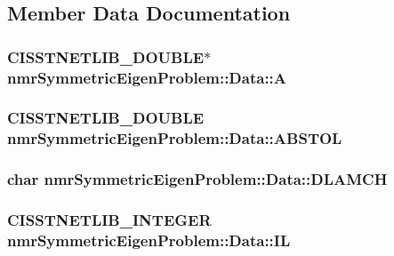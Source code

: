 \subsection{Member Data Documentation}
\hypertarget{classnmr_symmetric_eigen_problem_1_1_data_aa45f414eef4fb85b15868757aa728448}{
\subsubsection[{A}]{\setlength{\rightskip}{0pt plus 5cm}C\-I\-S\-S\-T\-N\-E\-T\-L\-I\-B\-\_\-\-D\-O\-U\-B\-L\-E$\ast$ nmr\-Symmetric\-Eigen\-Problem\-::\-Data\-::\-A}}\label{classnmr_symmetric_eigen_problem_1_1_data_aa45f414eef4fb85b15868757aa728448}
\hypertarget{classnmr_symmetric_eigen_problem_1_1_data_af5347eda97d1b64505380937953d1d97}{
\subsubsection[{A\-B\-S\-T\-O\-L}]{\setlength{\rightskip}{0pt plus 5cm}C\-I\-S\-S\-T\-N\-E\-T\-L\-I\-B\-\_\-\-D\-O\-U\-B\-L\-E nmr\-Symmetric\-Eigen\-Problem\-::\-Data\-::\-A\-B\-S\-T\-O\-L}}\label{classnmr_symmetric_eigen_problem_1_1_data_af5347eda97d1b64505380937953d1d97}
\hypertarget{classnmr_symmetric_eigen_problem_1_1_data_a0d4cc9287cdb029e975938ed4c153d65}{
\subsubsection[{D\-L\-A\-M\-C\-H}]{\setlength{\rightskip}{0pt plus 5cm}char nmr\-Symmetric\-Eigen\-Problem\-::\-Data\-::\-D\-L\-A\-M\-C\-H}}\label{classnmr_symmetric_eigen_problem_1_1_data_a0d4cc9287cdb029e975938ed4c153d65}
\hypertarget{classnmr_symmetric_eigen_problem_1_1_data_a67105932298cfc5cf99d0a4fc6839505}{
\subsubsection[{I\-L}]{\setlength{\rightskip}{0pt plus 5cm}C\-I\-S\-S\-T\-N\-E\-T\-L\-I\-B\-\_\-\-I\-N\-T\-E\-G\-E\-R nmr\-Symmetric\-Eigen\-Problem\-::\-Data\-::\-I\-L}}\label{classnmr_symmetric_eigen_problem_1_1_data_a67105932298cfc5cf99d0a4fc6839505}
